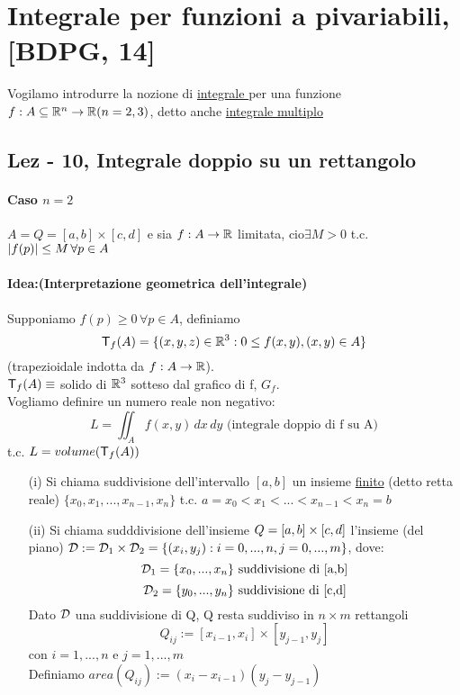 \chapter{Integrale per funzioni a pi\acu variabili, [BDPG, 14]}
Vogilamo introdurre la nozione di \underline{integrale } per una funzione 
$f: A \subseteq \mathbb{R}^n \to \mathbb{R} (n=2,3)$, detto anche \underline{integrale multiplo} 
\section{Lez - 10, Integrale doppio su un rettangolo}
\subsubsection{Caso $n=2$}
$A = Q = [a,b]\times [c,d]$ e sia $f:A\to \mathbb{R}$ limitata, 
cio\ace $\exists M > 0$ t.c. $\left\lvert f(p) \right\rvert \leq M \, \forall p \in A$\\\\
\textbf{Idea:(Interpretazione geometrica dell'integrale)} \\\\
Supponiamo $f(p)\geq 0 \, \forall p \in A$, definiamo 
$$\mathsf{T}_f(A) =\{(x,y,z)\in\mathbb{R}^3 : 0 \leq f(x,y), (x,y)\in A\}$$
(trapezioidale indotta da $f : A \to \mathbb{R}$). \\
$\mathsf{T}_f(A) \equiv$ solido di $\mathbb{R}^3$ sotteso dal grafico di f, $G_f$.\\
Vogliamo definire un numero reale non negativo:
$$L = \iint_{A} f(x,y)\,dx\,dy \text{ (integrale doppio di f su A)}$$
t.c. $L = volume(\mathsf{T}_f(A))$ 
\begin{definition}
  \begin{itemize}
    \item[(i)] Si chiama suddivisione dell'intervallo $[a,b]$ un insieme \underline{finito} (detto retta reale)
              $\{x_0,x_1,..., x_{n-1}, x_n\}$ t.c. $a = x_0 < x_1 < ... < x_{n-1} < x_n = b$
    \item[(ii)] Si chiama sudddivisione dell'insieme $Q = [a,b]\times[c,d]$ l'insieme (del piano)
      $\mathcal{D} := \mathcal{D}_1 \times \mathcal{D}_2 = \{(x_i,y_j): i = 0,..., n , j = 0,..., m\}$, dove:
      $$\mathcal{D}_1 = \{x_0,...,x_n\} \text{ suddivisione di [a,b]}$$ 
      $$\mathcal{D}_2 = \{y_0,...,y_n\} \text{ suddivisione di [c,d]}$$
      Dato $\mathcal{D}$ una suddivisione di Q, Q resta suddiviso in $n\times m$ rettangoli
      $$Q_{ij} := [x_{i-1}, x_i]\times[y_{j-1},y_j]$$
      con $i = 1,..., n$ e $j = 1,..., m$\\
      Definiamo $area(Q_{ij}):=(x_i-x_{i-1})(y_j-y_{j-1})$
  \end{itemize}
\end{definition}
